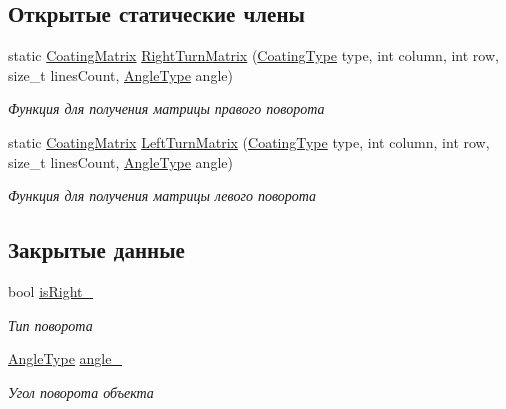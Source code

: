 \subsection*{Открытые статические члены}
\begin{DoxyCompactItemize}
\item 
static \hyperlink{namespacertm_ae3bb29510cfde424975be31866d2486e}{Coating\+Matrix} \hyperlink{classrtm_1_1_turn_object_a74dbdda621e1fbe6be1fe6373949bbad}{Right\+Turn\+Matrix} (\hyperlink{namespacertm_aecd3929e64cd461eb3555b611f6fad95}{Coating\+Type} type, int column, int row, size\+\_\+t lines\+Count, \hyperlink{namespacertm_a69dc82b16a0148c10962caa83d930f89}{Angle\+Type} angle)
\begin{DoxyCompactList}\small\item\em Функция для получения матрицы правого поворота \end{DoxyCompactList}\item 
static \hyperlink{namespacertm_ae3bb29510cfde424975be31866d2486e}{Coating\+Matrix} \hyperlink{classrtm_1_1_turn_object_a329c8abcba91f87b0dce98543d7448ba}{Left\+Turn\+Matrix} (\hyperlink{namespacertm_aecd3929e64cd461eb3555b611f6fad95}{Coating\+Type} type, int column, int row, size\+\_\+t lines\+Count, \hyperlink{namespacertm_a69dc82b16a0148c10962caa83d930f89}{Angle\+Type} angle)
\begin{DoxyCompactList}\small\item\em Функция для получения матрицы левого поворота \end{DoxyCompactList}\end{DoxyCompactItemize}
\subsection*{Закрытые данные}
\begin{DoxyCompactItemize}
\item 
\mbox{\label{classrtm_1_1_turn_object_aae270ae895bdc8edc482e21e1784f042}} 
bool \hyperlink{classrtm_1_1_turn_object_aae270ae895bdc8edc482e21e1784f042}{is\+Right\+\_\+}
\begin{DoxyCompactList}\small\item\em Тип поворота \end{DoxyCompactList}\item 
\mbox{\label{classrtm_1_1_turn_object_afcb2206b9201f0755281dc31fad29e50}} 
\hyperlink{namespacertm_a69dc82b16a0148c10962caa83d930f89}{Angle\+Type} \hyperlink{classrtm_1_1_turn_object_afcb2206b9201f0755281dc31fad29e50}{angle\+\_\+}
\begin{DoxyCompactList}\small\item\em Угол поворота объекта \end{DoxyCompactList}\end{DoxyCompactItemize}
